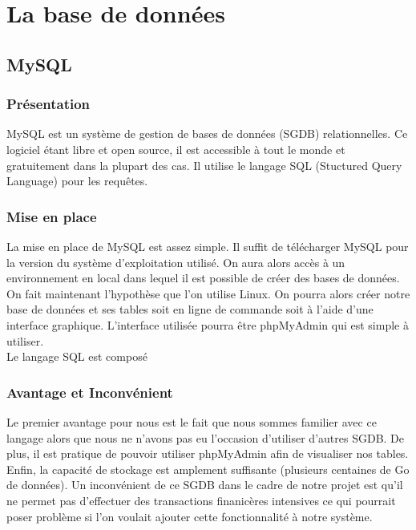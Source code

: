 \section{La base de données}

\subsection{MySQL}

\subsubsection{Présentation}
MySQL est un système de gestion de bases de données (SGDB) relationnelles. Ce logiciel étant libre et open source, il est accessible à tout le monde et gratuitement dans la plupart des cas.
Il utilise le langage SQL (Stuctured Query Language) pour les requêtes.

\subsubsection{Mise en place}
La mise en place de MySQL est assez simple. Il suffit de télécharger MySQL pour la version du système d'exploitation utilisé. On aura alors accès à un environnement en local dans lequel il est possible de créer des bases de données.\\

On fait maintenant l'hypothèse que l'on utilise Linux. On pourra alors créer notre base de données et ses tables soit en ligne de commande soit à l'aide d'une interface graphique. L'interface utilisée pourra être phpMyAdmin qui est simple à utiliser.\\

Le langage SQL est composé


\subsubsection{Avantage et Inconvénient}
Le premier avantage pour nous est le fait que nous sommes familier avec ce langage alors que nous ne n'avons pas eu l'occasion d'utiliser d'autres SGDB.
De plus, il est pratique de pouvoir utiliser phpMyAdmin afin de visualiser nos tables. Enfin, la capacité de stockage est amplement suffisante (plusieurs centaines de Go de données).
Un inconvénient de ce SGDB dans le cadre de notre projet est qu'il ne permet pas d'effectuer des transactions finanicères intensives ce qui pourrait poser problème si l'on voulait ajouter cette fonctionnalité à notre système.

